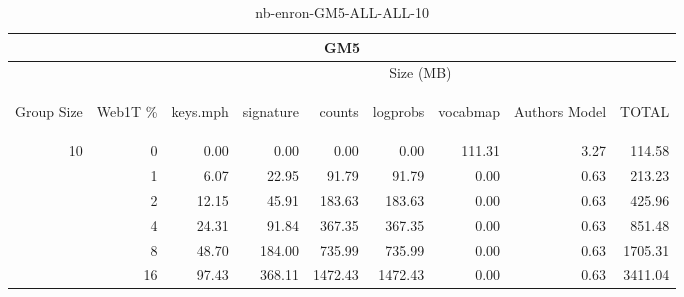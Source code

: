 \begin{center}
\begin{table}[htbp] 
 \begin{center}
\begin{tabular}{ | r | r | r | r | r | r | r | r | r |}
\hline
\multicolumn{9}{|c|}{GM5}\\
\hline
 & & \multicolumn{7}{|c|}{Size (MB)}\\ \cline{3-9}
\begin{sideways}Group Size\end{sideways} & \begin{sideways}Web1T \% \end{sideways} & \begin{sideways}keys.mph\end{sideways} & \begin{sideways}signature\end{sideways} & \begin{sideways}counts\end{sideways} & \begin{sideways}logprobs\end{sideways} & \begin{sideways}vocabmap\end{sideways} & \begin{sideways}Authors Model \end{sideways} & \begin{sideways}TOTAL\end{sideways}\\
\hline
\multirow{5}{*}{10}
 & 0 & 0.00 & 0.00 & 0.00 & 0.00 & 111.31 & 3.27 & 114.58\\ \cline{2-9}
 & 1 & 6.07 & 22.95 & 91.79 & 91.79 & 0.00 & 0.63 & 213.23\\ \cline{2-9}
 & 2 & 12.15 & 45.91 & 183.63 & 183.63 & 0.00 & 0.63 & 425.96\\ \cline{2-9}
 & 4 & 24.31 & 91.84 & 367.35 & 367.35 & 0.00 & 0.63 & 851.48\\ \cline{2-9}
 & 8 & 48.70 & 184.00 & 735.99 & 735.99 & 0.00 & 0.63 & 1705.31\\ \cline{2-9}
 & 16 & 97.43 & 368.11 & 1472.43 & 1472.43 & 0.00 & 0.63 & 3411.04\\ \cline{2-9}
\hline
\end{tabular}
\caption{nb-enron-GM5-ALL-ALL-10}
\label{table:nb-enron-GM5-ALL-ALL-10}
\end{center}
 \end{table}
\end{center}

